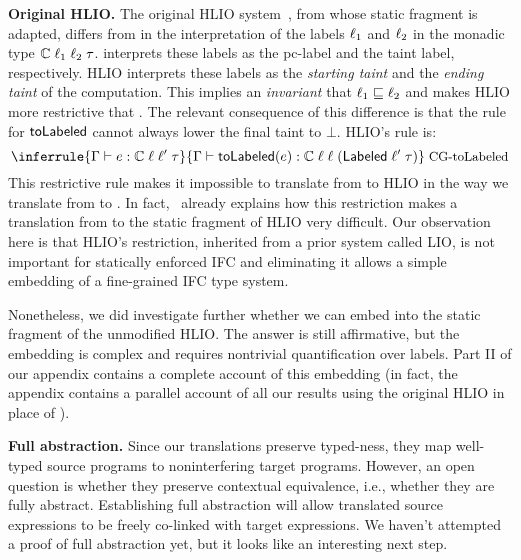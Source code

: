\medskip
\noindent\textbf{Original HLIO.} The original HLIO
system~\cite{icfp15-HLIO}, from whose static fragment {\cg} is
adapted, differs from {\cg} in the interpretation of the labels
$\ell_1$ and $\ell_2$ in the monadic type
$\mathbb{C}\;\ell_1\;\ell_2\;\tau$. {\cg} interprets these labels as
the pc-label and the taint label, respectively. HLIO interprets these
labels as the \emph{starting taint} and the \emph{ending taint} of the
computation. This implies an \emph{invariant} that $\ell_1 \sqsubseteq
\ell_2$ and makes HLIO more restrictive that {\cg}. The relevant
consequence of this difference is that the rule for $\mathsf{toLabeled}$
cannot always lower the final taint to $\bot$. HLIO's rule is:
\[   \inferrule
   { \Gamma \vdash e: \tslio{\llabel}{\llabel'}{\tau} }
   {
    \Gamma \vdash \etolabeled(e)
   		: \tslio{\llabel}{\llabel}{(\tlabeled{\llabel'}{\tau})}
   }
   \rname{{\cg}-toLabeled}
\]
This restrictive rule makes it impossible to translate from {\fg} to
HLIO in the way we translate from {\fg} to {\cg}. In
fact,~\cite{siglog17-ifcComp} already explains how this restriction
makes a translation from {\fg} to the static fragment of HLIO very
difficult. Our observation here is that HLIO's restriction, inherited
from a prior system called LIO, is not important for statically
enforced IFC and eliminating it allows a simple embedding of a
fine-grained IFC type system.

Nonetheless, we did investigate further whether we can embed {\fg}
into the static fragment of the unmodified HLIO. The answer is still
affirmative, but the embedding is complex and requires nontrivial
quantification over labels. Part II of our appendix contains a
complete account of this embedding (in fact, the appendix contains a
parallel account of all our results using the original HLIO in place
of {\cg}).


\medskip
\noindent \textbf{Full abstraction.}  Since our translations preserve
typed-ness, they map well-typed source programs to noninterfering
target programs. However, an open question is whether they preserve
contextual equivalence, i.e., whether they are fully
abstract. Establishing full abstraction will allow translated source
expressions to be freely co-linked with target expressions. We haven't
attempted a proof of full abstraction yet, but it looks like an
interesting next step. 

